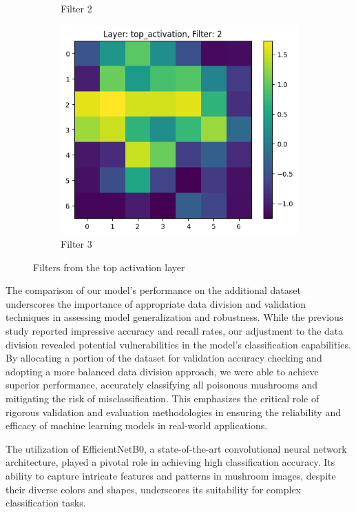 \begin{figure}[h]
\begin{subfigure}[b]{0.3\textwidth}
        \caption{Filter 2}
        \label{fig:filter2}
    \end{subfigure}
    \begin{subfigure}[b]{0.3\textwidth}
        \centering
        \includegraphics[width=\textwidth]{images/filter2 top_activation.png}
        \caption{Filter 3}
        \label{fig:filter3}
    \end{subfigure}
    \caption{Filters from the top activation layer}
    \label{fig:conv_filters}
\end{figure}

The comparison of our model's performance on the additional dataset underscores the importance of appropriate data division and validation techniques in assessing model generalization and robustness. While the previous study reported impressive accuracy and recall rates, our adjustment to the data division revealed potential vulnerabilities in the model's classification capabilities. By allocating a portion of the dataset for validation accuracy checking and adopting a more balanced data division approach, we were able to achieve superior performance, accurately classifying all poisonous mushrooms and mitigating the risk of misclassification. This emphasizes the critical role of rigorous validation and evaluation methodologies in ensuring the reliability and efficacy of machine learning models in real-world applications.


The utilization of EfficientNetB0, a state-of-the-art convolutional neural network architecture, played a pivotal role in achieving high classification accuracy. Its ability to capture intricate features and patterns in mushroom images, despite their diverse colors and shapes, underscores its suitability for complex classification tasks.



